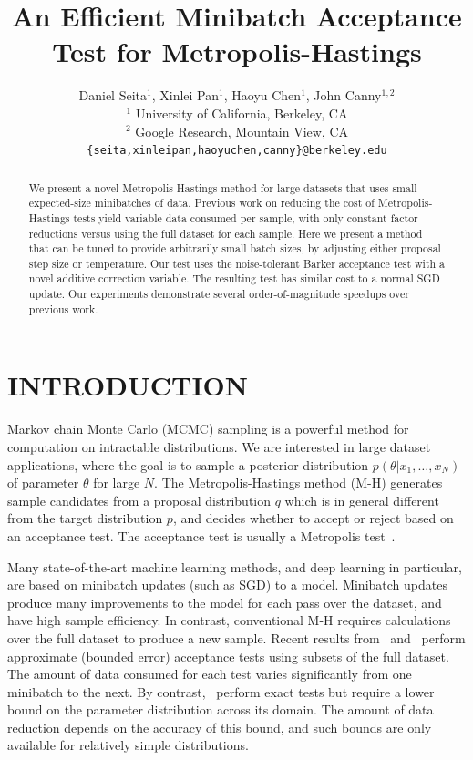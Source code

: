 \documentclass[letterpaper]{article}
\title{An Efficient Minibatch Acceptance Test for Metropolis-Hastings}
\author{
Daniel Seita$^1$, 
Xinlei Pan$^1$,
Haoyu Chen$^1$,
John Canny$^{1,2}$ \\
$^1$ University of California, Berkeley, CA \\
$^2$ Google Research, Mountain View, CA\\ 
\texttt{\{seita,xinleipan,haoyuchen,canny\}@berkeley.edu}
}
\begin{document}
\maketitle

\begin{abstract}
  We present a novel Metropolis-Hastings method for large datasets that
  uses small expected-size minibatches of data. Previous work on
  reducing the cost of Metropolis-Hastings tests yield variable data
  consumed per sample, with only constant factor reductions versus
  using the full dataset for each sample.  Here we present a method
  that can be tuned to provide arbitrarily small batch sizes, by
  adjusting either proposal step size or temperature. Our test uses
  the noise-tolerant Barker acceptance test with a novel additive
  correction variable.  The resulting test has similar cost to a normal
  SGD update. Our experiments demonstrate several order-of-magnitude
  speedups over previous work.
\end{abstract}



\section{INTRODUCTION}\label{sec:introduction}

Markov chain Monte Carlo (MCMC) sampling is a powerful method for computation on
intractable distributions. We are interested in large dataset applications,
where the goal is to sample a posterior distribution $p(\theta | x_1, \ldots,
x_N)$ of parameter $\theta$ for large $N$.  The Metropolis-Hastings method (M-H)
generates sample candidates from a proposal distribution $q$ which is in general
different from the target distribution $p$, and decides whether to accept or
reject based on an acceptance test. The acceptance test is usually a Metropolis
test~\citep{Metropolis1953, hastings70}.

Many state-of-the-art machine learning methods, and deep learning in particular,
are based on minibatch updates (such as SGD) to a model.  Minibatch updates
produce many improvements to the model for each pass over the dataset, and have
high sample efficiency.  In contrast, conventional M-H requires calculations
over the full dataset to produce a new sample.  Recent results
from~\citep{cutting_mh_2014} and~\citep{icml2014c1_bardenet14} perform
approximate (bounded error) acceptance tests using subsets of the full dataset.
The amount of data consumed for each test varies significantly from one
minibatch to the next. By contrast,~\citep{conf/uai/MaclaurinA14,TallData16}
perform exact tests but require a lower bound on the parameter distribution across
its domain.  The amount of data reduction depends on the accuracy of this bound,
and such bounds are only available for relatively simple distributions.
\end{document}
